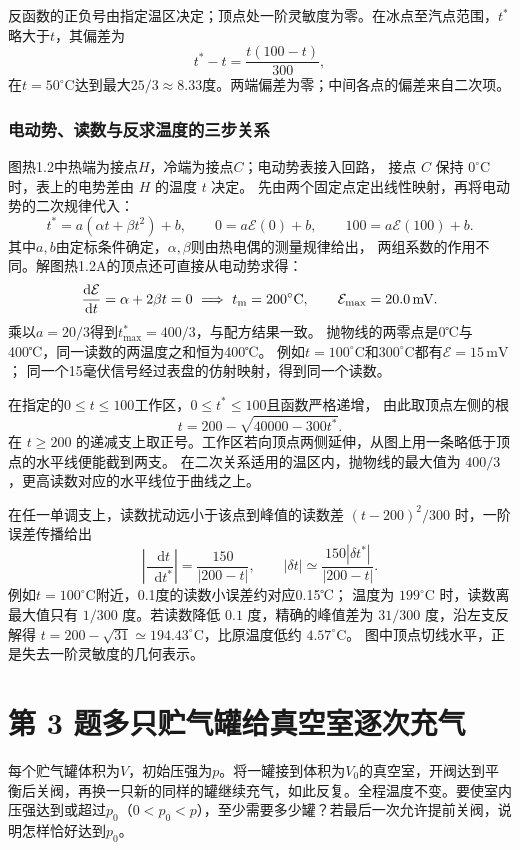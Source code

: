 \documentclass[UTF8,fontset=fandol,a4paper,11pt]{ctexart}
\newcommand{\dd}{\mathop{}\!\mathrm{d}}
\begin{document}
反函数的正负号由指定温区决定；顶点处一阶灵敏度为零。在冰点至汽点范围，$t^*$略大于$t$，其偏差为
\[t^*-t=\frac{t(100-t)}{300},\]
在$t=50^\circ\mathrm C$达到最大$25/3\approx8.33$度。两端偏差为零；中间各点的偏差来自二次项。
\subsubsection*{电动势、读数与反求温度的三步关系}
图热1.2中热端为接点$H$，冷端为接点$C$；电动势表接入回路，
接点 $C$ 保持 $0^\circ\mathrm C$ 时，表上的电势差由 $H$ 的温度 $t$ 决定。
先由两个固定点定出线性映射，再将电动势的二次规律代入：
\[
t^*=a(\alpha t+\beta t^2)+b,\qquad
0=a\mathcal E(0)+b,\qquad
100=a\mathcal E(100)+b.
\]
其中$a,b$由定标条件确定，$\alpha,\beta$则由热电偶的测量规律给出，
两组系数的作用不同。解图热1.2A的顶点还可直接从电动势求得：
\[
\frac{\dd\mathcal E}{\dd t}=\alpha+2\beta t=0
\ \Longrightarrow\ t_{\rm m}=200^\circ\mathrm C,\qquad
\mathcal E_{\max}=20.0\,\mathrm{mV}.
\]
乘以$a=20/3$得到$t^*_{\max}=400/3$，与配方结果一致。
抛物线的两零点是0℃与400℃，同一读数的两温度之和恒为400℃。
例如$t=100^\circ\mathrm C$和$300^\circ\mathrm C$都有$\mathcal E=15\,\mathrm{mV}$；
同一个15毫伏信号经过表盘的仿射映射，得到同一个读数。

在指定的$0\le t\le100$工作区，$0\le t^*\le100$且函数严格递增，
由此取顶点左侧的根
\[
t=200-\sqrt{40000-300t^*}.
\]
在 $t\ge200$ 的递减支上取正号。工作区若向顶点两侧延伸，从图上用一条略低于顶点的水平线便能截到两支。
在二次关系适用的温区内，抛物线的最大值为 $400/3$，更高读数对应的水平线位于曲线之上。

在任一单调支上，读数扰动远小于该点到峰值的读数差 $(t-200)^2/300$ 时，一阶误差传播给出
\[
\left|\frac{\dd t}{\dd t^*}\right|
=\frac{150}{|200-t|},\qquad
|\delta t|\simeq\frac{150|\delta t^*|}{|200-t|}.
\]
例如$t=100^\circ\mathrm C$附近，0.1度的读数小误差约对应0.15℃；
温度为 $199^\circ\mathrm C$ 时，读数离最大值只有 $1/300$ 度。若读数降低 $0.1$ 度，精确的峰值差为 $31/300$ 度，沿左支反解得 $t=200-\sqrt{31}\simeq194.43^\circ\mathrm C$，比原温度低约 $4.57^\circ\mathrm C$。
图中顶点切线水平，正是失去一阶灵敏度的几何表示。




\section*{第 3 题\quad 多只贮气罐给真空室逐次充气}

每个贮气罐体积为$V$，初始压强为$p$。将一罐接到体积为$V_0$的真空室，开阀达到平衡后关阀，再换一只新的同样的罐继续充气，如此反复。全程温度不变。要使室内压强达到或超过$p_0$（$0<p_0<p$），至少需要多少罐？若最后一次允许提前关阀，说明怎样恰好达到$p_0$。
\end{document}
